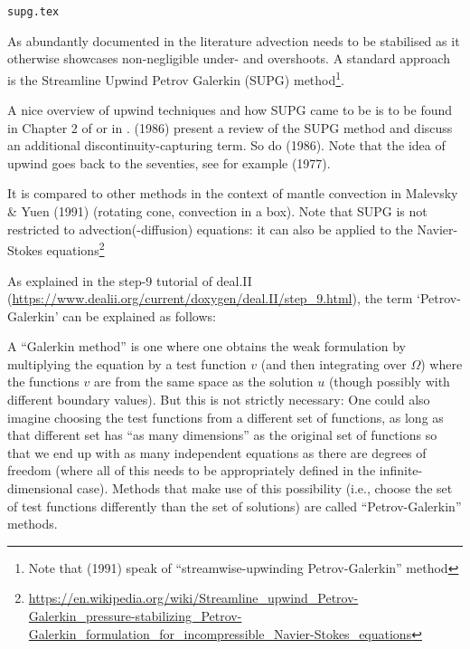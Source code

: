 \begin{flushright} {\tiny {\color{gray} \tt supg.tex}} \end{flushright}

As abundantly documented in the literature advection needs to be stabilised
as it otherwise showcases non-negligible under- and overshoots.
A standard approach is the Streamline Upwind Petrov Galerkin (SUPG) 
method\footnote{Note that \textcite{mayu91} (1991) speak of ``streamwise-upwinding Petrov-Galerkin'' method}.

A nice overview of upwind techniques and how SUPG came to be is to be found in Chapter 
2 of \textcite{dohu03} or in \textcite{brhu82}.
\textcite{humm86} (1986) present a review of the SUPG method 
and discuss an additional discontinuity-capturing term. 
So do \textcite{tepa86} (1986).
Note that the idea of upwind goes back to the seventies, see for example 
\textcite{hehz77} (1977).

It is compared to other methods in the context of mantle convection in 
Malevsky \& Yuen (1991) \cite{mayu91} (rotating cone, convection in a box). 
Note that SUPG is not restricted to advection(-diffusion) equations: it can also
be applied to the Navier-Stokes equations\footnote{\url{https://en.wikipedia.org/wiki/Streamline_upwind_Petrov-Galerkin_pressure-stabilizing_Petrov-Galerkin_formulation_for_incompressible_Navier-Stokes_equations}}

As explained in the step-9 tutorial of deal.II (\url{https://www.dealii.org/current/doxygen/deal.II/step_9.html}), the term `Petrov-Galerkin' can be explained as follows: 
\begin{displayquote}
{\color{MidnightBlue}
A ``Galerkin method'' is one where one obtains the weak formulation by multiplying the equation by a test function $v$ (and then integrating over $\Omega$) where the functions $v$ are from the same space as the solution $u$ (though possibly with different boundary values). But this is not strictly necessary: One could also imagine choosing the test functions from a different set of functions, as long as that different set has ``as many dimensions'' as the original set of functions so that we end up with as many independent equations as there are degrees of freedom (where all of this needs to be appropriately defined in the infinite-dimensional case). Methods that make use of this possibility (i.e., choose the set of test functions differently than the set of solutions) are called ``Petrov-Galerkin'' methods. }
\end{displayquote}

